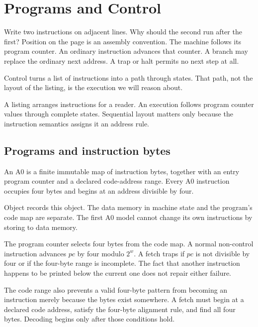 \chapter{Programs and Control}
\label{ch:programs-control}

Write two instructions on adjacent lines. Why should the second run after the
first? Position on the page is an assembly convention. The machine follows its
program counter. An ordinary instruction advances that counter. A branch may
replace the ordinary next address. A trap or halt permits no next step at all.

Control turns a list of instructions into a path through states. That path,
not the layout of the listing, is the execution we will reason about.

\begin{keyidea}[title={A program listing is not an execution}]
A listing arranges instructions for a reader. An execution follows program
counter values through complete states. Sequential layout matters only because
the instruction semantics assigns it an address rule.
\end{keyidea}

\section{Programs and instruction bytes}

\begin{definition}[title={A0 program}]
An A0  is a finite immutable map of instruction bytes,
together with an entry program counter and a declared code-address range.
Every A0 instruction occupies four bytes and begins at an address divisible
by four.
\end{definition}

Object  records this object. The data memory in machine
state and the program's code map are separate. The first A0 model cannot
change its own instructions by storing to data memory.

The program counter selects four bytes from the code map. A normal
non-control instruction advances \(pc\) by four modulo \(2^w\). A fetch traps
if \(pc\) is not divisible by four or if the four-byte range is incomplete.
The fact that another instruction happens to be printed below the current one
does not repair either failure.

The code range also prevents a valid four-byte pattern from becoming an
instruction merely because the bytes exist somewhere. A fetch must begin at a
declared code address, satisfy the four-byte alignment rule, and find all four
bytes. Decoding begins only after those conditions hold.

